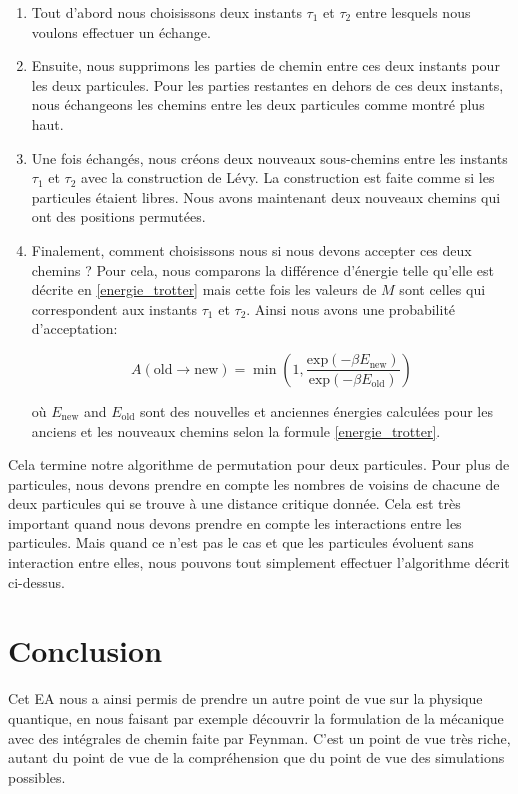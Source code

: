 \documentclass[11pt]{article}
\theoremstyle{definition}
\theoremstyle{remark}
\begin{document}
\begin{enumerate} 
\item 
Tout d'abord nous choisissons deux instants $\tau_1$ et $\tau_2$ entre lesquels nous voulons effectuer un échange. 
\item 
Ensuite, nous supprimons les parties de chemin entre ces deux instants pour les deux particules. Pour les parties restantes en dehors de ces deux instants, nous échangeons les chemins entre les deux particules comme montré plus haut. 
\item 
Une fois échangés, nous créons deux nouveaux sous-chemins entre les instants $\tau_1$ et $\tau_2$ avec la construction de Lévy. La construction est faite comme si les particules étaient libres. Nous avons maintenant deux nouveaux chemins qui ont des positions permutées. 
\item 
Finalement, comment choisissons nous si nous devons accepter ces deux chemins ? Pour cela, nous comparons la différence d'énergie telle qu'elle est décrite en \eqref{energie_trotter} mais cette fois les valeurs de $M$ sont celles qui correspondent aux instants $\tau_1$ et $\tau_2$. Ainsi nous avons une probabilité d'acceptation: 

\begin{equation}
\label{acceptance_levy} 
A(\mathrm{old}\rightarrow \mathrm{new}) = \min\left(1,\frac{\mathrm{exp}(-\beta E_{\mathrm{new}})}{\mathrm{exp}(-\beta E_{\mathrm{old}})}\right)
\end{equation}

où $E_\mathrm{new}$ and $E_\mathrm{old}$ sont des nouvelles et anciennes énergies calculées pour les anciens et les nouveaux chemins selon la formule \eqref{energie_trotter}. 
\end{enumerate}

Cela termine notre algorithme de permutation pour deux particules. Pour plus de particules, nous devons prendre en compte les nombres de voisins de chacune de deux particules qui se trouve à une distance critique donnée. Cela est très important quand nous devons prendre en compte les interactions entre les particules. Mais quand ce n'est pas le cas et que les particules évoluent sans interaction entre elles, nous pouvons tout simplement effectuer l'algorithme décrit ci-dessus. 
\newpage
\section*{Conclusion}
Cet EA nous a ainsi permis de prendre un autre point de vue sur la physique quantique, en nous faisant par exemple découvrir la formulation de la mécanique avec des intégrales de chemin faite par Feynman. C'est un point de vue très riche, autant du point de vue de la compréhension que du point de vue des simulations possibles.
\\
\end{document}
